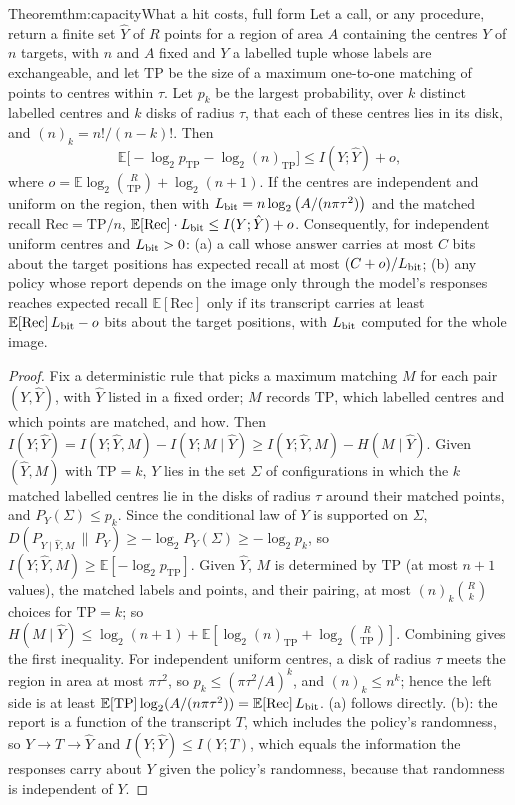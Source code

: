 \begin{restate}{Theorem}{thm:capacity}{What a hit costs, full form}
Let a call, or any procedure, return a finite set $\hat Y$ of $R$ points for a region of area $A$ containing the centres $Y$ of $n$ targets, with $n$ and $A$ fixed and $Y$ a labelled tuple whose labels are exchangeable, and let $\mathrm{TP}$ be the size of a maximum one-to-one matching of points to centres within $\tau$. Let $p_k$ be the largest probability, over $k$ distinct labelled centres and $k$ disks of radius $\tau$, that each of these centres lies in its disk, and $(n)_k = n!/(n-k)!$. Then
\[
\mathbb{E}\big[-\log_2 p_{\mathrm{TP}} - \log_2 (n)_{\mathrm{TP}}\big] \le I(Y; \hat Y) + o,
\]
where $o = \mathbb{E}\log_2\binom{R}{\mathrm{TP}} + \log_2(n+1)$. If the centres are independent and uniform on the region, then with $L_{\mathrm{bit}} = n\log_2\big(A/(n\pi\tau^2)\big)$ and the matched recall $\mathrm{Rec} = \mathrm{TP}/n$, $\mathbb{E}[\mathrm{Rec}] \cdot L_{\mathrm{bit}} \le I(Y; \hat Y) + o$. Consequently, for independent uniform centres and $L_{\mathrm{bit}} > 0$: (a) a call whose answer carries at most $C$ bits about the target positions has expected recall at most $(C + o)/L_{\mathrm{bit}}$; (b) any policy whose report depends on the image only through the model's responses reaches expected recall $\mathbb{E}[\mathrm{Rec}]$ only if its transcript carries at least $\mathbb{E}[\mathrm{Rec}]\,L_{\mathrm{bit}} - o$ bits about the target positions, with $L_{\mathrm{bit}}$ computed for the whole image.
\end{restate}

\begin{proof}
Fix a deterministic rule that picks a maximum matching $M$ for each pair $(Y, \hat Y)$, with $\hat Y$ listed in a fixed order; $M$ records $\mathrm{TP}$, which labelled centres and which points are matched, and how. Then $I(Y; \hat Y) = I(Y; \hat Y, M) - I(Y; M \mid \hat Y) \ge I(Y; \hat Y, M) - H(M \mid \hat Y)$. Given $(\hat Y, M)$ with $\mathrm{TP} = k$, $Y$ lies in the set $\Sigma$ of configurations in which the $k$ matched labelled centres lie in the disks of radius $\tau$ around their matched points, and $P_Y(\Sigma) \le p_k$. Since the conditional law of $Y$ is supported on $\Sigma$, $D(P_{Y \mid \hat Y, M} \,\|\, P_Y) \ge -\log_2 P_Y(\Sigma) \ge -\log_2 p_k$, so $I(Y; \hat Y, M) \ge \mathbb{E}[-\log_2 p_{\mathrm{TP}}]$. Given $\hat Y$, $M$ is determined by $\mathrm{TP}$ (at most $n+1$ values), the matched labels and points, and their pairing, at most $(n)_k\binom{R}{k}$ choices for $\mathrm{TP} = k$; so $H(M \mid \hat Y) \le \log_2(n+1) + \mathbb{E}[\log_2 (n)_{\mathrm{TP}} + \log_2 \binom{R}{\mathrm{TP}}]$. Combining gives the first inequality. For independent uniform centres, a disk of radius $\tau$ meets the region in area at most $\pi\tau^2$, so $p_k \le (\pi\tau^2/A)^k$, and $(n)_k \le n^k$; hence the left side is at least $\mathbb{E}[\mathrm{TP}]\log_2(A/(n\pi\tau^2)) = \mathbb{E}[\mathrm{Rec}]\,L_{\mathrm{bit}}$. (a) follows directly. (b): the report is a function of the transcript $T$, which includes the policy's randomness, so $Y \to T \to \hat Y$ and $I(Y; \hat Y) \le I(Y; T)$, which equals the information the responses carry about $Y$ given the policy's randomness, because that randomness is independent of $Y$.
\end{proof}

